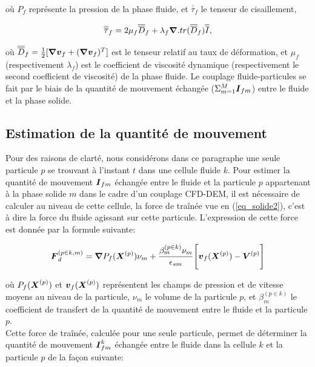 où $P_f$ représente la pression de la phase fluide, et $\overline{\overline{\tau}}_f$ le tenseur de cisaillement,

\begin{equation} \label{eq_fluide1}
\overline{\overline{\tau}}_f = 2 \mu_f \overline{\overline{D}}_f + \lambda_f \boldsymbol{\nabla} . tr(\overline{\overline{D}}_f) \overline{\overline{I}},
\end{equation}

où $\overline{\overline{D}}_f = \frac{1}{2}[\boldsymbol{\nabla} \boldsymbol{v}_f + (\boldsymbol{\nabla} \boldsymbol{v}_f)^{T}]$ est le tenseur relatif au taux de déformation, et $\mu_f$ (respectivement $\lambda_f$) est le coefficient de viscosité dynamique (respectivement le second coefficient de viscosité) de la phase fluide. Le couplage fluide-particules se fait par le biais de la quantité de mouvement échangée ($\Sigma_{m=1}^{M}\boldsymbol{I}_{fm}$) entre le fluide et la phase solide.\\ 

\subsection*{Estimation de la quantité de mouvement}

Pour des raisons de clarté, nous considérons dans ce paragraphe  une seule particule $p$ se trouvant à l'instant $t$ dans une cellule fluide $k$. Pour estimer la quantité de mouvement $\boldsymbol{I}_{fm}$ échangée entre le fluide et la particule $p$ appartenant à la phase solide $m$ dans le cadre d'un couplage CFD-DEM, il est nécessaire de calculer au niveau de cette cellule, la force de traînée vue en (\ref{eq_solide2}), c'est à dire la force du fluide agissant sur cette particule. L'expression de cette force est donnée par la formule suivante: 

\begin{equation} \label{drag_force}
\boldsymbol{F}_d^{(p \in k,m)} = \boldsymbol{\nabla} P_f(\boldsymbol{X}^{(p)})\nu_m + \frac{\beta_m^{(p \in k)}\nu_m}{\epsilon_{sm}}\Bigg[\boldsymbol{v}_f(\boldsymbol{X}^{(p)})-\boldsymbol{V}^{(p)}\Bigg]
\end{equation}

\noindent où $P_f(\boldsymbol{X}^{(p)})$ et $\boldsymbol{v}_f(\boldsymbol{X}^{(p)})$ représentent les champs de pression et de vitesse moyens au niveau de la particule, $\nu_m$ le volume de la particule $p$, et $\beta_m^{(p \in k)}$ le coefficient de transfert de la quantité de mouvement entre le fluide et la particule $p$.\\

Cette force de traînée, calculée pour une seule particule, permet de déterminer la quantité de mouvement $\boldsymbol{I}_{fm}^k$ échangée entre le fluide dans la cellule $k$ et la particule $p$ de la façon suivante:

